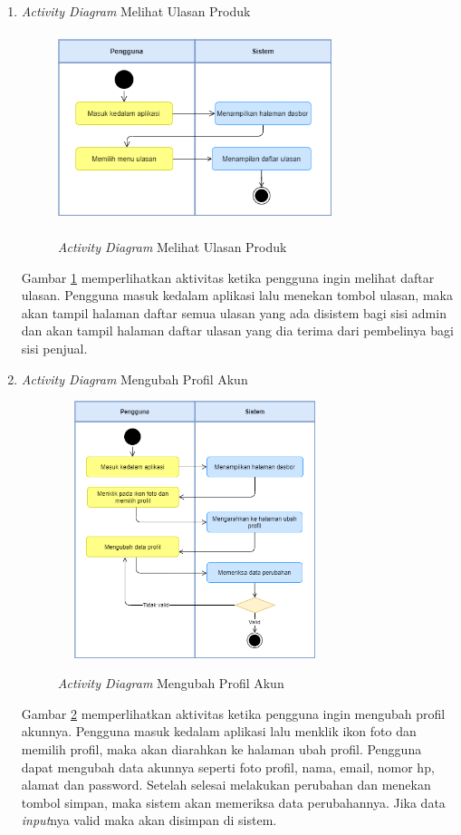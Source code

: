 \begin{enumerate}
	\item \textit{Activity Diagram} Melihat Ulasan Produk
	\begin{figure}[H]
		\centering
		{\includegraphics [width = 8cm, height= 5.5cm]{gambar/activity diagram/lihat ulasan}}
		\caption{\textit{Activity Diagram} Melihat Ulasan Produk}
		\label{lihat ulasan}
	\end{figure}
	\par Gambar \ref*{lihat ulasan} memperlihatkan aktivitas ketika pengguna ingin melihat daftar ulasan. Pengguna masuk kedalam aplikasi lalu menekan tombol ulasan, maka akan tampil halaman daftar semua ulasan yang ada disistem bagi sisi admin dan akan tampil halaman daftar ulasan yang dia terima dari pembelinya bagi sisi penjual.

	\item \textit{Activity Diagram} Mengubah Profil Akun
	\begin{figure}[H]
		\centering
		{\includegraphics [width = 8cm, height= 7.5cm]{gambar/activity diagram/ubah profil}}
		\caption{\textit{Activity Diagram} Mengubah Profil Akun}
		\label{ubah profil}
	\end{figure}
	\par Gambar \ref*{ubah profil} memperlihatkan aktivitas ketika pengguna ingin mengubah profil akunnya. Pengguna masuk kedalam aplikasi lalu menklik ikon foto dan memilih profil, maka akan diarahkan ke halaman ubah profil. Pengguna dapat mengubah data akunnya seperti foto profil, nama, email, nomor hp, alamat dan password. Setelah selesai melakukan perubahan dan menekan tombol simpan, maka sistem akan memeriksa data perubahannya. Jika data \textit{input}nya valid maka akan disimpan di sistem.
\end{enumerate}

